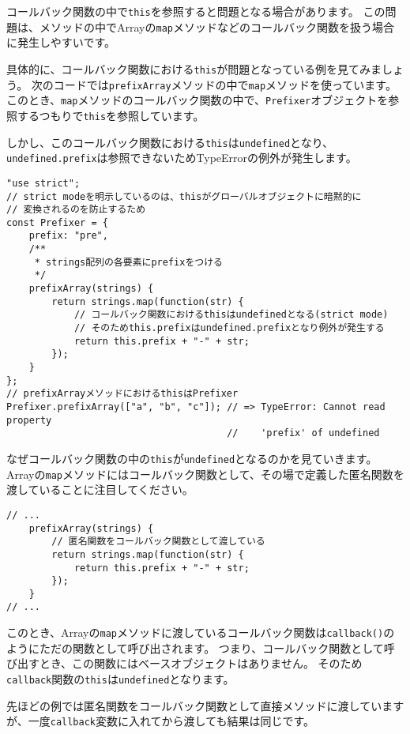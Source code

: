 コールバック関数の中で\texttt{this}を参照すると問題となる場合があります。
この問題は、メソッドの中でArrayの\texttt{map}メソッドなどのコールバック関数を扱う場合に発生しやすいです。

具体的に、コールバック関数における\texttt{this}が問題となっている例を見てみましょう。
次のコードでは\texttt{prefixArray}メソッドの中で\texttt{map}メソッドを使っています。
このとき、\texttt{map}メソッドのコールバック関数の中で、\texttt{Prefixer}オブジェクトを参照するつもりで\texttt{this}を参照しています。

しかし、このコールバック関数における\texttt{this}は\texttt{undefined}となり、\texttt{undefined.prefix}は参照できないためTypeErrorの例外が発生します。

\begin{lstlisting}
"use strict";
// strict modeを明示しているのは、thisがグローバルオブジェクトに暗黙的に
// 変換されるのを防止するため
const Prefixer = {
    prefix: "pre",
    /**
     * strings配列の各要素にprefixをつける
     */
    prefixArray(strings) {
        return strings.map(function(str) {
            // コールバック関数におけるthisはundefinedとなる(strict mode)
            // そのためthis.prefixはundefined.prefixとなり例外が発生する
            return this.prefix + "-" + str;
        });
    }
};
// prefixArrayメソッドにおけるthisはPrefixer
Prefixer.prefixArray(["a", "b", "c"]); // => TypeError: Cannot read property 
                                       //    'prefix' of undefined
\end{lstlisting}

なぜコールバック関数の中の\texttt{this}が\texttt{undefined}となるのかを見ていきます。
Arrayの\texttt{map}メソッドにはコールバック関数として、その場で定義した匿名関数を渡していることに注目してください。

\begin{lstlisting}
// ...
    prefixArray(strings) {
        // 匿名関数をコールバック関数として渡している
        return strings.map(function(str) {
            return this.prefix + "-" + str;
        });
    }
// ...
\end{lstlisting}

このとき、Arrayの\texttt{map}メソッドに渡しているコールバック関数は\texttt{callback()}のようにただの関数として呼び出されます。
つまり、コールバック関数として呼び出すとき、この関数にはベースオブジェクトはありません。
そのため\texttt{callback}関数の\texttt{this}は\texttt{undefined}となります。

先ほどの例では匿名関数をコールバック関数として直接メソッドに渡していますが、一度\texttt{callback}変数に入れてから渡しても結果は同じです。

